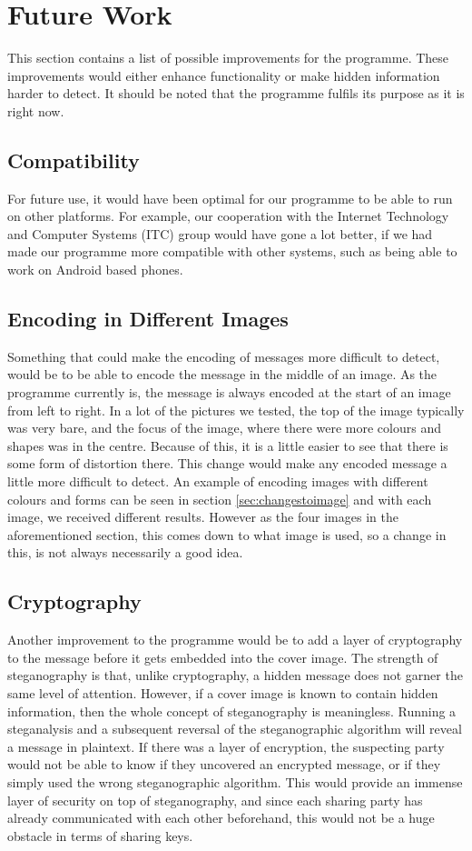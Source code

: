 \section{Future Work}
This section contains a list of possible improvements for the programme.
These improvements would either enhance functionality or make hidden information harder to detect.
It should be noted that the programme fulfils its purpose as it is right now.

\subsection*{Compatibility}
For future use, it would have been optimal for our programme to be able to run on other platforms.
For example, our cooperation with the Internet Technology and Computer Systems (ITC) group would have gone a lot better, if we had made our programme more compatible with other systems, such as being able to work on Android based phones.

\subsection*{Encoding in Different Images}
Something that could make the encoding of messages more difficult to detect, would be to be able to encode the message in the middle of an image.
As the programme currently is,  the message is always encoded at the start of an image from left to right.
In a lot of the pictures we tested, the top of the image typically was very bare, and the focus of the image, where there were more colours and shapes was in the centre.
Because of this, it is a little easier to see that there is some form of distortion there.
This change would make any encoded message a little more difficult to detect.
An example of encoding images with different colours and forms can be seen in section \ref{sec:changestoimage} and with each image, we received different results. However as the four images in the aforementioned section, this comes down to what image is used, so a change in this, is not always necessarily a good idea.

\subsection*{Cryptography}
Another improvement to the programme would be to add a layer of cryptography to the message before it gets embedded into the cover image.
The strength of steganography is that, unlike cryptography, a hidden message does not garner the same level of attention.
However, if a cover image is known to contain hidden information, then the whole concept of steganography is meaningless.
Running a steganalysis and a subsequent reversal of the steganographic algorithm will reveal a message in plaintext.
If there was a layer of encryption, the suspecting party would not be able to know if they uncovered an encrypted message, or if they simply used the wrong steganographic algorithm.
This would provide an immense layer of security on top of steganography, and since each sharing party has already communicated with each other beforehand, this would not be a huge obstacle in terms of sharing keys.

